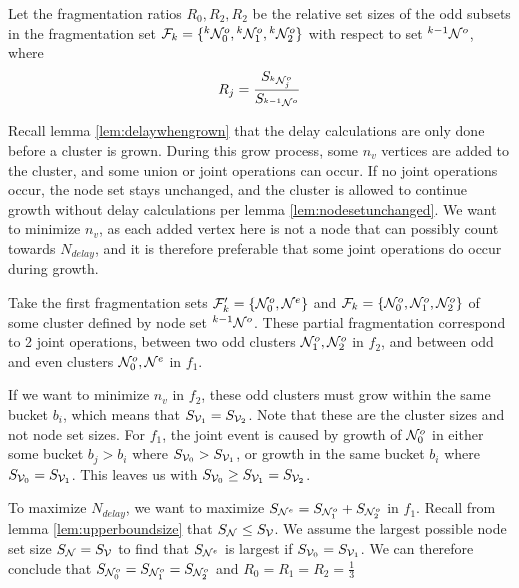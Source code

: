 \begin{lemma}\label{lem:fragratio}
  Let the fragmentation ratios $R_0, R_2, R_2$ be the relative set sizes of the odd subsets in the fragmentation set $\mathcal{F}_{k} = \{{}^{k}\mathcal{N}^o_0, {}^{k}\mathcal{N}^{o}_1, {}^{k}\mathcal{N}^{o}_2 \}$ with respect to set ${}^{k-1}\mathcal{N}^o$, where
  \begin{equation}\label{eq:fragratio}
    R_j = \frac{S_{{}^{k}\mathcal{N}^o_j}}{S_{{}^{k-1}\mathcal{N}^o}}
  \end{equation}
\end{lemma}

Recall lemma \ref{lem:delaywhengrown} that the delay calculations are only done before a cluster is grown. During this grow process, some $n_v$ vertices are added to the cluster, and some union or joint operations can occur. If no joint operations occur, the node set stays unchanged, and the cluster is allowed to continue growth without delay calculations per lemma \ref{lem:nodesetunchanged}. We want to minimize $n_v$, as each added vertex here is not a node that can possibly count towards $N_{delay}$, and it is therefore preferable that some joint operations do occur during growth. 

Take the first fragmentation sets $\mathcal{F}'_{k} = \{\mathcal{N}^o_0, \mathcal{N}^{e} \}$ and $\mathcal{F}_{k} = \{\mathcal{N}^o_0, \mathcal{N}^{o}_1, \mathcal{N}^{o}_2 \}$ of some cluster defined by node set ${}^{k-1}\mathcal{N}^o$. These partial fragmentation correspond to 2 joint operations, between two odd clusters $ \mathcal{N}^{o}_1, \mathcal{N}^{o}_2 $ in $f_2$, and between odd and even clusters $\mathcal{N}^o_0, \mathcal{N}^{e} $ in $f_1$.

If we want to minimize $n_v$ in $f_2$, these odd clusters must grow within the same bucket $b_i$, which means that $S_{\mathcal{V}_1} = S_{\mathcal{V}_2}$. Note that these are the cluster sizes and not node set sizes. For $f_1$, the joint event is caused by growth of $\mathcal{N}^o_0$ in either some bucket $b_j > b_i$ where $ S_{\mathcal{V}_0} > S_{\mathcal{V}_1} $, or growth in the same bucket $b_i$ where $S_{\mathcal{V}_0} = S_{\mathcal{V}_1} $. This leaves us with $S_{\mathcal{V}_0} \geq S_{\mathcal{V}_1} = S_{\mathcal{V}_2}$.

To maximize $N_{delay}$, we want to maximize $S_{\mathcal{N}^e} = S_{\mathcal{N}^o_1} + S_{\mathcal{N}^o_2}$ in $f_1$. Recall from lemma \ref{lem:upperboundsize} that $S_{\mathcal{N}} \leq S_{\mathcal{V}}$. We assume the largest possible node set size $S_{\mathcal{N}} = S_{\mathcal{V}}$ to find that $ S_{\mathcal{N}^e} $ is largest if $S_{\mathcal{V}_0} = S_{\mathcal{V}_1}$. We can therefore conclude that $S_{\mathcal{N}^o_0} = S_{\mathcal{N}^o_1} = S_{\mathcal{N}^o_2}$ and $R_0 = R_1 = R_2 = \frac{1}{3}$

